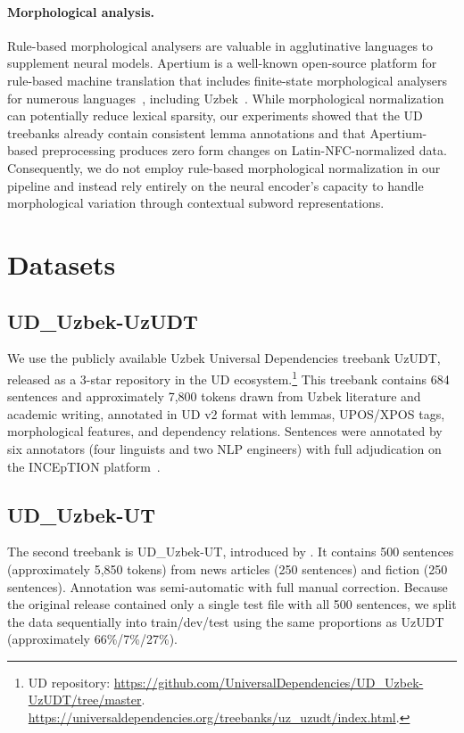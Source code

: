 \documentclass[runningheads]{llncs}
\begin{document}
\paragraph{Morphological analysis.}
Rule-based morphological analysers are valuable in agglutinative languages to supplement neural models. Apertium is a well-known open-source platform for rule-based machine translation that includes finite-state morphological analysers for numerous languages~\cite{Forcada2011}, including Uzbek~\cite{Salaev2024, 2301.12711, MURZINTCEV2026100195}. While morphological normalization can potentially reduce lexical sparsity, our experiments showed that the UD treebanks already contain consistent lemma annotations and that Apertium-based preprocessing produces zero form changes on Latin-NFC-normalized data. Consequently, we do not employ rule-based morphological normalization in our pipeline and instead rely entirely on the neural encoder's capacity to handle morphological variation through contextual subword representations.

\section{Datasets}
\label{sec:datasets}

\subsection{UD\_Uzbek-UzUDT}
\label{subsec:uzudt}
We use the publicly available Uzbek Universal Dependencies treebank UzUDT, released as a 3-star repository in the UD ecosystem.\footnote{UD repository: \url{https://github.com/UniversalDependencies/UD_Uzbek-UzUDT/tree/master}.\\
\url{https://universaldependencies.org/treebanks/uz_uzudt/index.html}.}
This treebank contains 684 sentences and approximately 7{,}800 tokens drawn from Uzbek literature and academic writing, annotated in UD v2 format with lemmas, UPOS/XPOS tags, morphological features, and dependency relations. Sentences were annotated by six annotators (four linguists and two NLP engineers) with full adjudication on the INCEpTION platform~\cite{matlatipov2025goldudt}.

\subsection{UD\_Uzbek-UT}
\label{subsec:ut}
The second treebank is UD\_Uzbek-UT, introduced by \cite{akhundjanova-talamo-2025-universal}. It contains 500 sentences (approximately 5{,}850 tokens) from news articles (250 sentences) and fiction (250 sentences). Annotation was semi-automatic with full manual correction. Because the original release contained only a single test file with all 500 sentences, we split the data sequentially into train/dev/test using the same proportions as UzUDT (approximately 66\%/7\%/27\%).
\end{document}
